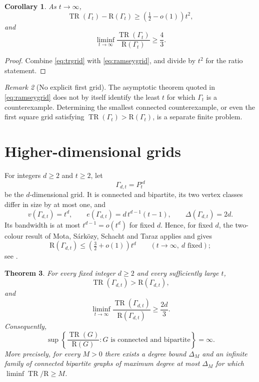 \documentclass[11pt,reqno]{amsart}
\theoremstyle{plain}
\newtheorem{theorem}{Theorem}
\newtheorem{corollary}[theorem]{Corollary}
\theoremstyle{definition}
\theoremstyle{remark}
\newtheorem{remark}[theorem]{Remark}
\DeclareMathOperator{\TR}{TR}
\newcommand{\R}{\mathrm{R}}
\begin{document}
\begin{corollary}
As $t \to \infty$,
\[
\TR(\Gamma_t) - \R(\Gamma_t) \geq \left( \tfrac{1}{2} - o(1) \right) t^2,
\]
and
\[
\liminf_{t \to \infty} \frac{\TR(\Gamma_t)}{\R(\Gamma_t)} \geq \frac{4}{3}.
\]
\end{corollary}

\begin{proof}
Combine \eqref{eq:trgrid} with \eqref{eq:ramseygrid}, and divide by $t^2$ for the ratio statement.
\end{proof}

\begin{remark}[No explicit first grid]
The asymptotic theorem quoted in \eqref{eq:ramseygrid} does not by itself identify the least $t$ for which $\Gamma_t$ is a counterexample. Determining the smallest connected counterexample, or even the first square grid satisfying $\TR(\Gamma_t) > \R(\Gamma_t)$, is a separate finite problem.
\end{remark}

\section{Higher-dimensional grids}

For integers $d \geq 2$ and $t \geq 2$, let
\[
\Gamma_{d,t} = P_t^{\square d}
\]
be the $d$-dimensional grid. It is connected and bipartite, its two vertex classes differ in size by at most one, and
\begin{equation}\label{eq:dgrid}
v(\Gamma_{d,t}) = t^d, \qquad e(\Gamma_{d,t}) = d\, t^{d-1}(t-1), \qquad \Delta(\Gamma_{d,t}) = 2d.
\end{equation}
Its bandwidth is at most $t^{d-1} = o(t^d)$ for fixed $d$. Hence, for fixed $d$, the two-colour result of Mota, S\'ark\"ozy, Schacht and Taraz applies and gives
\begin{equation}\label{eq:ramseydgrid}
\R(\Gamma_{d,t}) \leq \left( \tfrac{3}{2} + o(1) \right) t^d \qquad (t \to \infty,\ d \text{ fixed});
\end{equation}
see \cite[Theorem 1.2 and the discussion of higher-dimensional grids]{MSST}.

\begin{theorem}\label{thm:dgrid}
For every fixed integer $d \geq 2$ and every sufficiently large $t$,
\[
\TR(\Gamma_{d,t}) > \R(\Gamma_{d,t}),
\]
and
\[
\liminf_{t \to \infty} \frac{\TR(\Gamma_{d,t})}{\R(\Gamma_{d,t})} \geq \frac{2d}{3}.
\]
Consequently,
\[
\sup \left\{ \frac{\TR(G)}{\R(G)} : G \text{ is connected and bipartite} \right\} = \infty.
\]
More precisely, for every $M > 0$ there exists a degree bound $\Delta_M$ and an infinite family of connected bipartite graphs of maximum degree at most $\Delta_M$ for which $\liminf \TR/\R \geq M$.
\end{theorem}
\end{document}
